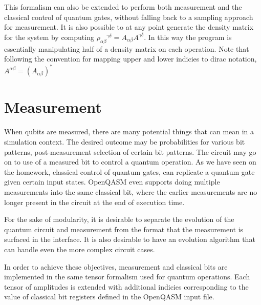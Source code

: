 \documentclass[%
 reprint,
 amsmath,amssymb,
 aps,
]{revtex4-2}
\begin{document}
This formalism can also be extended to perform both measurement and the classical control of quantum gates, without falling back to a sampling approach for measurement. It is also possible to at any point generate the density matrix for the system by computing ${\rho_{\alpha\beta}}^{\gamma\delta} = A_{\alpha\beta} A^{\gamma\delta}$. In this way the program is essentially manipulating half of a density matrix on each operation. Note that following the convention for mapping upper and lower indicies to dirac notation, ${A}^{\alpha\beta}  = ({A}_{\alpha\beta})^{\ast}$


\section{\label{sec:level1} \label{measure} Measurement}
When qubits are measured, there are many potential things that can mean in a simulation context. The desired outcome may be probabilities for various bit patterns, post-measurement selection of certain bit patterns. The circuit may go on to use of a measured bit to control a quantum operation. As we have seen on the homework, classical control of quantum gates, can replicate a quantum gate given certain input states. OpenQASM even supports doing multiple measurements into the same classical bit, where the earlier measurements are no longer present in the circuit at the end of execution time. 

For the sake of modularity, it is desirable to separate the evolution of the quantum circuit and measurement from the format that the measurement is surfaced in the interface. It is also desirable to have an evolution algorithm that can handle even the more complex circuit cases.

In order to achieve these objectives, measurement and classical bits are implemented in the same tensor formalism used for quantum operations. Each tensor of amplitudes is extended with additional indicies corresponding to the value of classical bit registers defined in the OpenQASM input file. 
\end{document}

